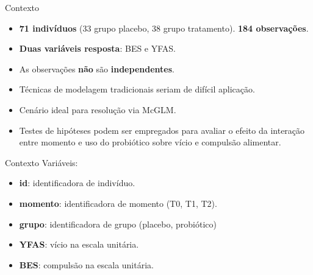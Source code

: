 \documentclass[
  ignorenonframetext,
  serif,
  professionalfont,
  usenames,
  dvipsnames,
  aspectratio = 169]{beamer}
\begin{document}
\begin{frame}{Contexto}
\protect\hypertarget{contexto-2}{}
\begin{itemize}
  \itemsep 2ex
  
  \item \textbf{71 indivíduos} (33 grupo placebo, 38 grupo tratamento). \textbf{184 observações}. 

  \item \textbf{Duas variáveis resposta}: BES e YFAS.

  \item As observações \textbf{não} são \textbf{independentes}.

  \item Técnicas de modelagem tradicionais seriam de difícil aplicação. 

  \item Cenário ideal para resolução via McGLM.

  \item Testes de hipóteses podem ser empregados para avaliar o efeito da interação entre momento e uso do probiótico sobre vício e compulsão alimentar.

\end{itemize}
\end{frame}

\begin{frame}{Contexto}
\protect\hypertarget{contexto-3}{}
Variáveis:

\begin{itemize}
  \item \textbf{id}: identificadora de indivíduo.
  \item \textbf{momento}: identificadora de momento (T0, T1, T2).
  \item \textbf{grupo}: identificadora de grupo (placebo, probiótico)
  \item \textbf{YFAS}: vício na escala unitária.
  \item \textbf{BES}: compulsão na escala unitária.
\end{itemize}
\end{frame}
\end{document}
